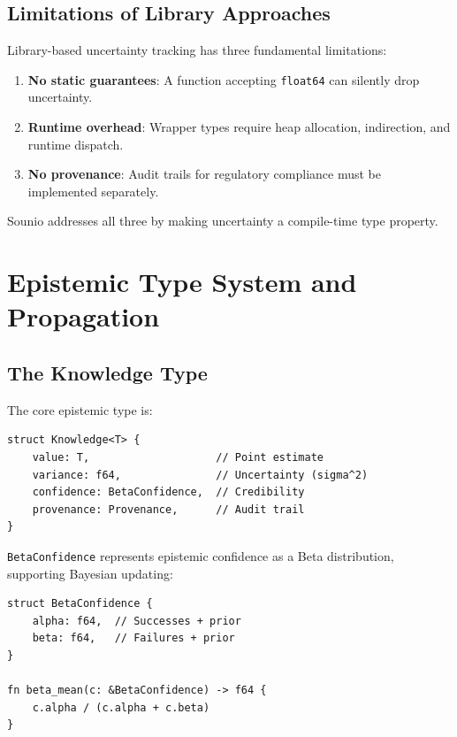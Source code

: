 \documentclass[journal]{IEEEtran}
\begin{document}
\subsection{Limitations of Library Approaches}

Library-based uncertainty tracking has three fundamental limitations:
\begin{enumerate}
  \item \textbf{No static guarantees}: A function accepting
        \texttt{float64} can silently drop uncertainty.
  \item \textbf{Runtime overhead}: Wrapper types require heap allocation,
        indirection, and runtime dispatch.
  \item \textbf{No provenance}: Audit trails for regulatory compliance
        must be implemented separately.
\end{enumerate}

Sounio addresses all three by making uncertainty a compile-time type
property.

\section{Epistemic Type System and Propagation}
\label{sec:type-system}

\subsection{The Knowledge Type}

The core epistemic type is:

\begin{lstlisting}[caption={Knowledge type definition}]
struct Knowledge<T> {
    value: T,                    // Point estimate
    variance: f64,               // Uncertainty (sigma^2)
    confidence: BetaConfidence,  // Credibility
    provenance: Provenance,      // Audit trail
}
\end{lstlisting}

\texttt{BetaConfidence} represents epistemic confidence as a Beta
distribution, supporting Bayesian updating:

\begin{lstlisting}[caption={Confidence representation}]
struct BetaConfidence {
    alpha: f64,  // Successes + prior
    beta: f64,   // Failures + prior
}

fn beta_mean(c: &BetaConfidence) -> f64 {
    c.alpha / (c.alpha + c.beta)
}
\end{lstlisting}
\end{document}

